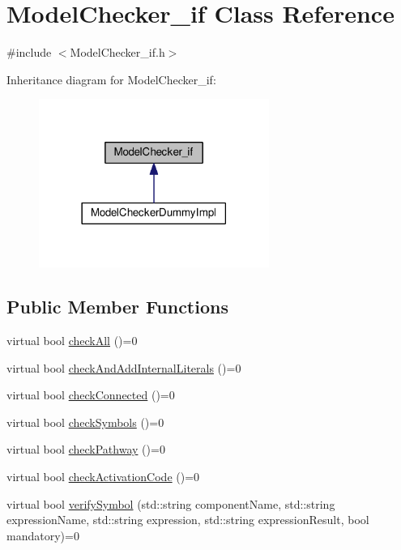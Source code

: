 \hypertarget{class_model_checker__if}{}\section{Model\+Checker\+\_\+if Class Reference}
\label{class_model_checker__if}


{\ttfamily \#include $<$Model\+Checker\+\_\+if.\+h$>$}



Inheritance diagram for Model\+Checker\+\_\+if\+:
\nopagebreak
\begin{figure}[H]
\begin{center}
\leavevmode
\includegraphics[width=213pt]{class_model_checker__if__inherit__graph}
\end{center}
\end{figure}
\subsection*{Public Member Functions}
\begin{DoxyCompactItemize}
\item 
virtual bool \hyperlink{class_model_checker__if_a83bc988696c49a17e0e7668e24743251}{check\+All} ()=0
\item 
virtual bool \hyperlink{class_model_checker__if_a22989b69e688a96fd200e740d33181a5}{check\+And\+Add\+Internal\+Literals} ()=0
\item 
virtual bool \hyperlink{class_model_checker__if_a0d527f054d705b5527bb6521e51c34a7}{check\+Connected} ()=0
\item 
virtual bool \hyperlink{class_model_checker__if_a92ab650708e675a1818b41fe4eb93a59}{check\+Symbols} ()=0
\item 
virtual bool \hyperlink{class_model_checker__if_a1d1e71dcfd02500cf2a844a62395ac36}{check\+Pathway} ()=0
\item 
virtual bool \hyperlink{class_model_checker__if_af5be5d01ea1c549eee6b94907f5ccb74}{check\+Activation\+Code} ()=0
\item 
virtual bool \hyperlink{class_model_checker__if_a36eada12fe9753f5c89099c572e27426}{verify\+Symbol} (std\+::string component\+Name, std\+::string expression\+Name, std\+::string expression, std\+::string expression\+Result, bool mandatory)=0
\end{DoxyCompactItemize}


